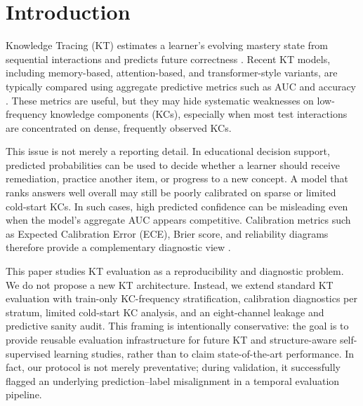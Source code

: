 \section{Introduction}
\label{sec:introduction}
Knowledge Tracing (KT) estimates a learner's evolving mastery state from sequential interactions and predicts future correctness \citep{corbett1994knowledge,piech2015deep,abdelrahman2023knowledge}. Recent KT models, including memory-based, attention-based, and transformer-style variants, are typically compared using aggregate predictive metrics such as AUC and accuracy \citep{zhang2017dynamic,ghosh2020context,liu2023simplekt}. These metrics are useful, but they may hide systematic weaknesses on low-frequency knowledge components (KCs), especially when most test interactions are concentrated on dense, frequently observed KCs.

This issue is not merely a reporting detail. In educational decision support, predicted probabilities can be used to decide whether a learner should receive remediation, practice another item, or progress to a new concept. A model that ranks answers well overall may still be poorly calibrated on sparse or limited cold-start KCs. In such cases, high predicted confidence can be misleading even when the model's aggregate AUC appears competitive. Calibration metrics such as Expected Calibration Error (ECE), Brier score, and reliability diagrams therefore provide a complementary diagnostic view \citep{guo2017calibration,brier1950verification,degroot1983comparison}.

This paper studies KT evaluation as a reproducibility and diagnostic problem. We do not propose a new KT architecture. Instead, we extend standard KT evaluation with train-only KC-frequency stratification, calibration diagnostics per stratum, limited cold-start KC analysis, and an eight-channel leakage and predictive sanity audit. This framing is intentionally conservative: the goal is to provide reusable evaluation infrastructure for future KT and structure-aware self-supervised learning studies, rather than to claim state-of-the-art performance. In fact, our protocol is not merely preventative; during validation, it successfully flagged an underlying prediction--label misalignment in a temporal evaluation pipeline.

